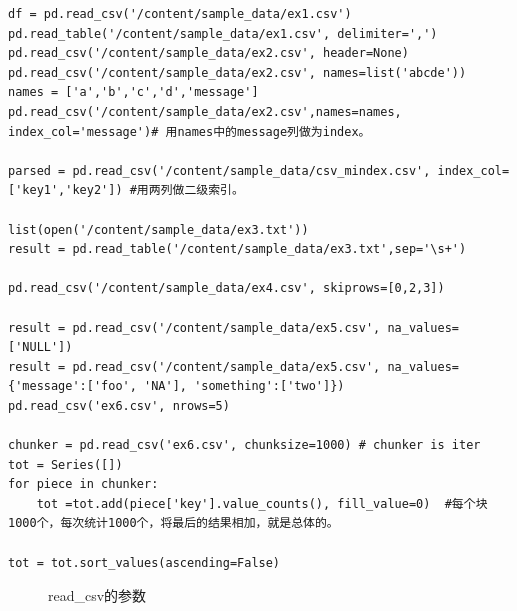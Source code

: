 \documentclass{article}
\begin{document}
\begin{lstlisting}
df = pd.read_csv('/content/sample_data/ex1.csv')
pd.read_table('/content/sample_data/ex1.csv', delimiter=',')
pd.read_csv('/content/sample_data/ex2.csv', header=None)
pd.read_csv('/content/sample_data/ex2.csv', names=list('abcde'))
names = ['a','b','c','d','message']
pd.read_csv('/content/sample_data/ex2.csv',names=names, index_col='message')# 用names中的message列做为index。

parsed = pd.read_csv('/content/sample_data/csv_mindex.csv', index_col=['key1','key2']) #用两列做二级索引。

list(open('/content/sample_data/ex3.txt'))
result = pd.read_table('/content/sample_data/ex3.txt',sep='\s+')

pd.read_csv('/content/sample_data/ex4.csv', skiprows=[0,2,3])

result = pd.read_csv('/content/sample_data/ex5.csv', na_values=['NULL'])
result = pd.read_csv('/content/sample_data/ex5.csv', na_values={'message':['foo', 'NA'], 'something':['two']})
pd.read_csv('ex6.csv', nrows=5)

chunker = pd.read_csv('ex6.csv', chunksize=1000) # chunker is iter
tot = Series([])
for piece in chunker:
	tot =tot.add(piece['key'].value_counts(), fill_value=0)  #每个块1000个，每次统计1000个，将最后的结果相加，就是总体的。

tot = tot.sort_values(ascending=False)
\end{lstlisting}
\begin{figure}
	\centering
	\caption{read\_csv的参数}
	\label{fig-csvparams}
\end{figure}
\end{document}
